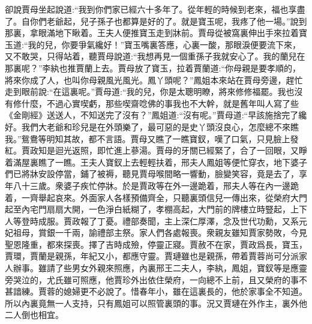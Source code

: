 


\begin{parag}
    卻說賈母坐起說道:“我到你們家已經六十多年了。從年輕的時候到老來，福也享盡了。自你們老爺起，兒子孫子也都算是好的了。就是寶玉呢，我疼了他一場。”說到那裏，拿眼滿地下瞅着。王夫人便推寶玉走到牀前。賈母從被窩裏伸出手來拉着寶玉道:“我的兒，你要爭氣纔好！”寶玉嘴裏答應，心裏一酸，那眼淚便要流下來，又不敢哭，只得站着，聽賈母說道:“我想再見一個重孫子我就安心了。我的蘭兒在那裏呢？”李紈也推賈蘭上去。賈母放了寶玉，拉着賈蘭道:“你母親是要孝順的，將來你成了人，也叫你母親風光風光。鳳丫頭呢？”鳳姐本來站在賈母旁邊，趕忙走到眼前說:“在這裏呢。”賈母道:“我的兒，你是太聰明瞭，將來修修福罷。我也沒有修什麼，不過心實喫虧，那些喫齋唸佛的事我也不大幹，就是舊年叫人寫了些《金剛經》送送人，不知送完了沒有？”鳳姐道:“沒有呢。”賈母道:“早該施捨完了纔好。我們大老爺和珍兒是在外頭樂了，最可惡的是史丫頭沒良心，怎麼總不來瞧我。”鴛鴦等明知其故，都不言語。賈母又瞧了一瞧寶釵，嘆了口氣，只見臉上發紅。賈政知是迴光返照，即忙進上蔘湯。賈母的牙關已經緊了，合了一回眼，又睜着滿屋裏瞧了一瞧。王夫人寶釵上去輕輕扶着，邢夫人鳳姐等便忙穿衣，地下婆子們已將牀安設停當，鋪了被褥，聽見賈母喉間略一響動，臉變笑容，竟是去了，享年八十三歲。衆婆子疾忙停牀。於是賈政等在外一邊跪着，邢夫人等在內一邊跪着，一齊舉起哀來。外面家人各樣預備齊全，只聽裏頭信兒一傳出來，從榮府大門起至內宅門扇扇大開，一色淨白紙糊了，孝棚高起，大門前的牌樓立時豎起，上下人等登時成服。賈政報了丁憂。禮部奏聞，主上深仁厚澤，念及世代功勳，又系元妃祖母，賞銀一千兩，諭禮部主祭。家人們各處報喪。衆親友雖知賈家勢敗，今見聖恩隆重，都來探喪。擇了吉時成殮，停靈正寢。賈赦不在家，賈政爲長，寶玉，賈環，賈蘭是親孫，年紀又小，都應守靈。賈璉雖也是親孫，帶着賈蓉尚可分派家人辦事。雖請了些男女外親來照應，內裏邢王二夫人，李紈，鳳姐，寶釵等是應靈旁哭泣的，尤氏雖可照應，他賈珍外出依住榮府，一向總不上前，且又榮府的事不甚諳練。賈蓉的媳婦更不必說了。惜春年小，雖在這裏長的，他於家事全不知道。所以內裏竟無一人支持，只有鳳姐可以照管裏頭的事。況又賈璉在外作主，裏外他二人倒也相宜。
\end{parag}


